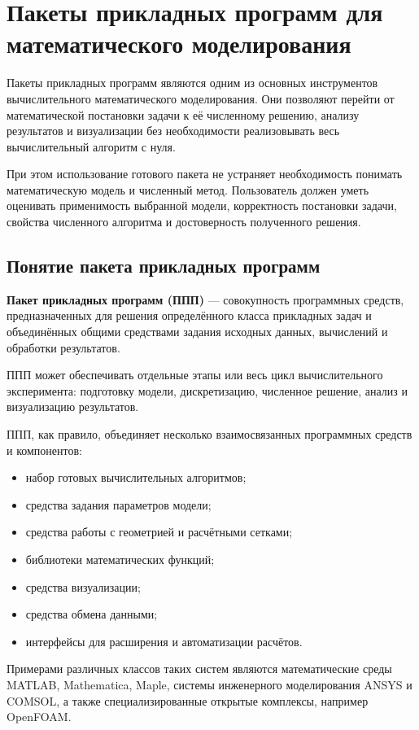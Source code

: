 \section{Пакеты прикладных программ для математического моделирования}

Пакеты прикладных программ являются одним из основных инструментов вычислительного математического моделирования. Они позволяют перейти от математической постановки задачи к её численному решению, анализу результатов и визуализации без необходимости реализовывать весь вычислительный алгоритм с нуля.

При этом использование готового пакета не устраняет необходимость понимать математическую модель и численный метод. Пользователь должен уметь оценивать применимость выбранной модели, корректность постановки задачи, свойства численного алгоритма и достоверность полученного решения.

\subsection{Понятие пакета прикладных программ}

\textbf{Пакет прикладных программ (ППП)} --- совокупность программных средств, предназначенных для решения определённого класса прикладных задач и объединённых общими средствами задания исходных данных, вычислений и обработки результатов.

ППП может обеспечивать отдельные этапы или весь цикл вычислительного эксперимента: подготовку модели, дискретизацию, численное решение, анализ и визуализацию результатов.

ППП, как правило, объединяет несколько взаимосвязанных программных средств и компонентов:
\begin{itemize}
	\item набор готовых вычислительных алгоритмов;
	\item средства задания параметров модели;
	\item средства работы с геометрией и расчётными сетками;
	\item библиотеки математических функций;
	\item средства визуализации;
	\item средства обмена данными;
	\item интерфейсы для расширения и автоматизации расчётов.
\end{itemize}

Примерами различных классов таких систем являются математические среды MATLAB, Mathematica, Maple, системы инженерного моделирования ANSYS и COMSOL, а также специализированные открытые комплексы, например OpenFOAM.

